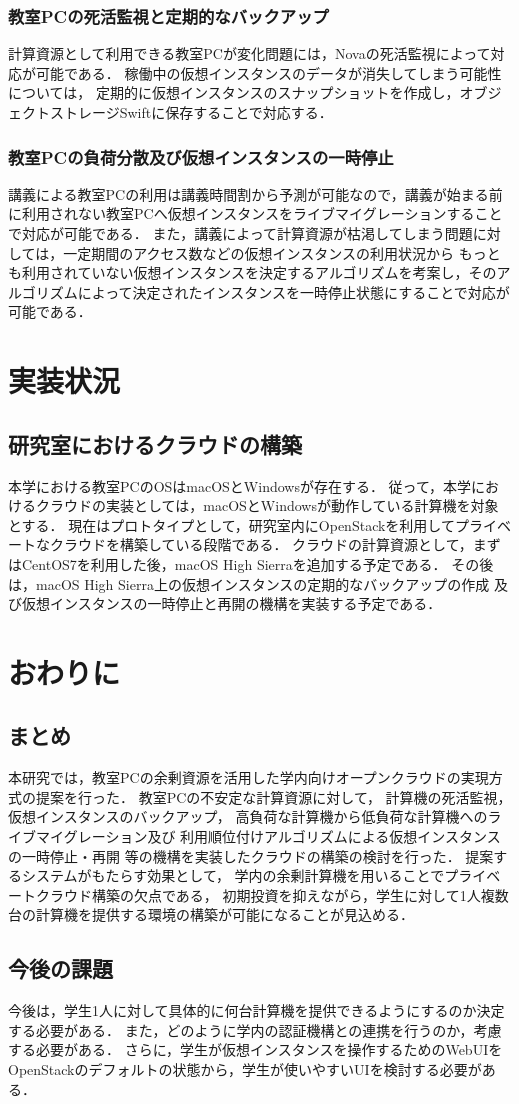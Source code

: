 \documentclass[11pt,a4paper]{jsarticle}
\begin{document}
\subsubsection{教室PCの死活監視と定期的なバックアップ}
計算資源として利用できる教室PCが変化問題には，Novaの死活監視によって対応が可能である．
稼働中の仮想インスタンスのデータが消失してしまう可能性については，
定期的に仮想インスタンスのスナップショットを作成し，オブジェクトストレージSwiftに保存することで対応する．
\subsubsection{教室PCの負荷分散及び仮想インスタンスの一時停止}
講義による教室PCの利用は講義時間割から予測が可能なので，講義が始まる前に利用されない教室PCへ仮想インスタンスをライブマイグレーションすることで対応が可能である．
また，講義によって計算資源が枯渇してしまう問題に対しては，一定期間のアクセス数などの仮想インスタンスの利用状況から
もっとも利用されていない仮想インスタンスを決定するアルゴリズムを考案し，そのアルゴリズムによって決定されたインスタンスを一時停止状態にすることで対応が可能である．

\section{実装状況}
\subsection{研究室におけるクラウドの構築}
本学における教室PCのOSはmacOSとWindowsが存在する．
従って，本学におけるクラウドの実装としては，macOSとWindowsが動作している計算機を対象とする．
現在はプロトタイプとして，研究室内にOpenStackを利用してプライベートなクラウドを構築している段階である．
クラウドの計算資源として，まずはCentOS7を利用した後，macOS High Sierraを追加する予定である．
その後は，macOS High Sierra上の仮想インスタンスの定期的なバックアップの作成
及び仮想インスタンスの一時停止と再開の機構を実装する予定である．

\section{おわりに}
\subsection{まとめ}
本研究では，教室PCの余剰資源を活用した学内向けオープンクラウドの実現方式の提案を行った．
教室PCの不安定な計算資源に対して，
計算機の死活監視，仮想インスタンスのバックアップ，
高負荷な計算機から低負荷な計算機へのライブマイグレーション及び
利用順位付けアルゴリズムによる仮想インスタンスの一時停止・再開
等の機構を実装したクラウドの構築の検討を行った．
提案するシステムがもたらす効果として，
学内の余剰計算機を用いることでプライベートクラウド構築の欠点である，
初期投資を抑えながら，学生に対して1人複数台の計算機を提供する環境の構築が可能になることが見込める．
\subsection{今後の課題}
今後は，学生1人に対して具体的に何台計算機を提供できるようにするのか決定する必要がある．
また，どのように学内の認証機構との連携を行うのか，考慮する必要がある．
さらに，学生が仮想インスタンスを操作するためのWebUIをOpenStackのデフォルトの状態から，学生が使いやすいUIを検討する必要がある．


\end{document}
